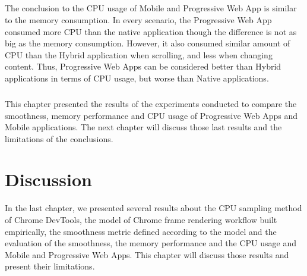 \documentclass{kththesis}
\begin{document}
\paragraph{}
The conclusion to the CPU usage of Mobile and Progressive Web App is similar to the memory consumption. In every scenario, the Progressive Web App consumed more CPU than the native application though the difference is not as big as the memory consumption. However, it also consumed similar amount of CPU than the Hybrid application when scrolling, and less when changing content. Thus, Progressive Web Apps can be considered better than Hybrid applications in terms of CPU usage, but worse than Native applications.

\paragraph{}
This chapter presented the results of the experiments conducted to compare the smoothness, memory performance and CPU usage of Progressive Web Apps and Mobile applications. The next chapter will discuss those last results and the limitations of the conclusions.


\chapter{Discussion}
\label{ch:discussion}

In the last chapter, we presented several results about the CPU sampling method of Chrome DevTools, the model of Chrome frame rendering workflow built empirically, the smoothness metric defined according to the model and the evaluation of the smoothness, the memory performance and the CPU usage and Mobile and Progressive Web Apps. This chapter will discuss those results and present their limitations.
\end{document}
